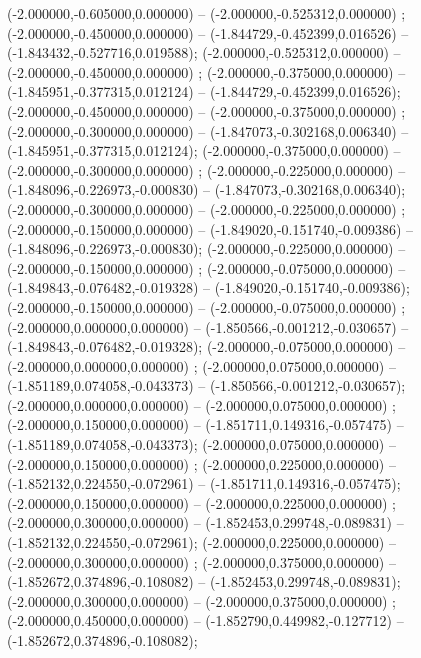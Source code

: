 (-2.000000,-0.605000,0.000000) -- (-2.000000,-0.525312,0.000000) ;
 (-2.000000,-0.450000,0.000000) -- (-1.844729,-0.452399,0.016526) -- (-1.843432,-0.527716,0.019588);
 (-2.000000,-0.525312,0.000000) -- (-2.000000,-0.450000,0.000000) ;
 (-2.000000,-0.375000,0.000000) -- (-1.845951,-0.377315,0.012124) -- (-1.844729,-0.452399,0.016526);
 (-2.000000,-0.450000,0.000000) -- (-2.000000,-0.375000,0.000000) ;
 (-2.000000,-0.300000,0.000000) -- (-1.847073,-0.302168,0.006340) -- (-1.845951,-0.377315,0.012124);
 (-2.000000,-0.375000,0.000000) -- (-2.000000,-0.300000,0.000000) ;
 (-2.000000,-0.225000,0.000000) -- (-1.848096,-0.226973,-0.000830) -- (-1.847073,-0.302168,0.006340);
 (-2.000000,-0.300000,0.000000) -- (-2.000000,-0.225000,0.000000) ;
 (-2.000000,-0.150000,0.000000) -- (-1.849020,-0.151740,-0.009386) -- (-1.848096,-0.226973,-0.000830);
 (-2.000000,-0.225000,0.000000) -- (-2.000000,-0.150000,0.000000) ;
 (-2.000000,-0.075000,0.000000) -- (-1.849843,-0.076482,-0.019328) -- (-1.849020,-0.151740,-0.009386);
 (-2.000000,-0.150000,0.000000) -- (-2.000000,-0.075000,0.000000) ;
 (-2.000000,0.000000,0.000000) -- (-1.850566,-0.001212,-0.030657) -- (-1.849843,-0.076482,-0.019328);
 (-2.000000,-0.075000,0.000000) -- (-2.000000,0.000000,0.000000) ;
 (-2.000000,0.075000,0.000000) -- (-1.851189,0.074058,-0.043373) -- (-1.850566,-0.001212,-0.030657);
 (-2.000000,0.000000,0.000000) -- (-2.000000,0.075000,0.000000) ;
 (-2.000000,0.150000,0.000000) -- (-1.851711,0.149316,-0.057475) -- (-1.851189,0.074058,-0.043373);
 (-2.000000,0.075000,0.000000) -- (-2.000000,0.150000,0.000000) ;
 (-2.000000,0.225000,0.000000) -- (-1.852132,0.224550,-0.072961) -- (-1.851711,0.149316,-0.057475);
 (-2.000000,0.150000,0.000000) -- (-2.000000,0.225000,0.000000) ;
 (-2.000000,0.300000,0.000000) -- (-1.852453,0.299748,-0.089831) -- (-1.852132,0.224550,-0.072961);
 (-2.000000,0.225000,0.000000) -- (-2.000000,0.300000,0.000000) ;
 (-2.000000,0.375000,0.000000) -- (-1.852672,0.374896,-0.108082) -- (-1.852453,0.299748,-0.089831);
 (-2.000000,0.300000,0.000000) -- (-2.000000,0.375000,0.000000) ;
 (-2.000000,0.450000,0.000000) -- (-1.852790,0.449982,-0.127712) -- (-1.852672,0.374896,-0.108082);
